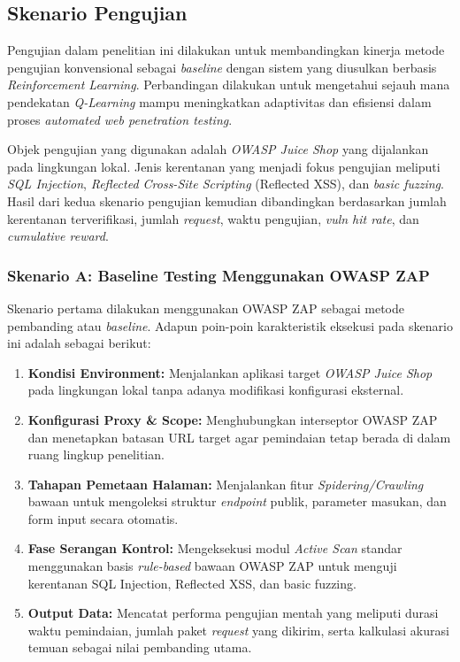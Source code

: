 \subsection{Skenario Pengujian}

Pengujian dalam penelitian ini dilakukan untuk membandingkan kinerja metode pengujian konvensional sebagai \textit{baseline} dengan sistem yang diusulkan berbasis \textit{Reinforcement Learning}. Perbandingan dilakukan untuk mengetahui sejauh mana pendekatan \textit{Q-Learning} mampu meningkatkan adaptivitas dan efisiensi dalam proses \textit{automated web penetration testing}.

Objek pengujian yang digunakan adalah \textit{OWASP Juice Shop} yang dijalankan pada lingkungan lokal. Jenis kerentanan yang menjadi fokus pengujian meliputi \textit{SQL Injection}, \textit{Reflected Cross-Site Scripting} (Reflected XSS), dan \textit{basic fuzzing}. Hasil dari kedua skenario pengujian kemudian dibandingkan berdasarkan jumlah kerentanan terverifikasi, jumlah \textit{request}, waktu pengujian, \textit{vuln hit rate}, dan \textit{cumulative reward}.

\subsubsection{Skenario A: Baseline Testing Menggunakan OWASP ZAP}

Skenario pertama dilakukan menggunakan OWASP ZAP sebagai metode pembanding atau \textit{baseline}. Adapun poin-poin karakteristik eksekusi pada skenario ini adalah sebagai berikut:

\begin{enumerate}
    \item \textbf{Kondisi Environment:} Menjalankan aplikasi target \textit{OWASP Juice Shop} pada lingkungan lokal tanpa adanya modifikasi konfigurasi eksternal.
    \item \textbf{Konfigurasi Proxy \& Scope:} Menghubungkan interseptor OWASP ZAP dan menetapkan batasan URL target agar pemindaian tetap berada di dalam ruang lingkup penelitian.
    \item \textbf{Tahapan Pemetaan Halaman:} Menjalankan fitur \textit{Spidering/Crawling} bawaan untuk mengoleksi struktur \textit{endpoint} publik, parameter masukan, dan form input secara otomatis.
    \item \textbf{Fase Serangan Kontrol:} Mengeksekusi modul \textit{Active Scan} standar menggunakan basis \textit{rule-based} bawaan OWASP ZAP untuk menguji kerentanan SQL Injection, Reflected XSS, dan basic fuzzing.
    \item \textbf{Output Data:} Mencatat performa pengujian mentah yang meliputi durasi waktu pemindaian, jumlah paket \textit{request} yang dikirim, serta kalkulasi akurasi temuan sebagai nilai pembanding utama.
\end{enumerate}

